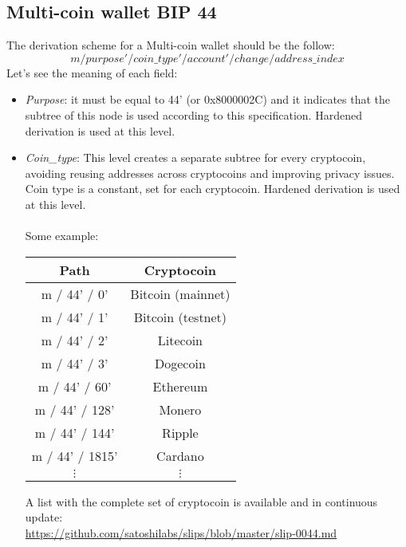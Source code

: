 \subsection{Multi-coin wallet BIP 44}
The derivation scheme for a Multi-coin wallet should be the follow:
\begin{equation*}
m / purpose' / coin\_type' / account' / change / address\_index
\end{equation*}
Let's see the meaning of each field:
\begin{itemize}
	\item \textit{Purpose}: it must be equal to 44' (or 0x8000002C)  and it indicates that the subtree of this node is used according to this specification. Hardened derivation is used at this level.
	\item \textit{Coin\_type}: This level creates a separate subtree for every cryptocoin, avoiding reusing addresses across cryptocoins and improving privacy issues. Coin type is a constant, set for each cryptocoin. Hardened derivation is used at this level.
	\\ \\
	Some example:
	\begin{center}
		\begin{tabular}{|| c | c ||} 
			\hline
			Path & Cryptocoin  \\ [0.5ex] 
			\hline\hline
			m / 44' / 0' & Bitcoin (mainnet) \\ 
			m / 44' / 1' & Bitcoin (testnet) \\			
			m / 44' / 2' & Litecoin \\			
			m / 44' / 3' & Dogecoin \\			
			m / 44' / 60' & Ethereum  \\ 
			m / 44' / 128' & Monero  \\
			m / 44' / 144' & Ripple  \\ 
			m / 44' / 1815' & Cardano  \\  
			$\vdots $& $\vdots $  \\ 
			\hline
		\end{tabular}
	\end{center}
	A list with the complete set of cryptocoin is available and in continuous update: \\ \url{https://github.com/satoshilabs/slips/blob/master/slip-0044.md }
	

\end{itemize}
